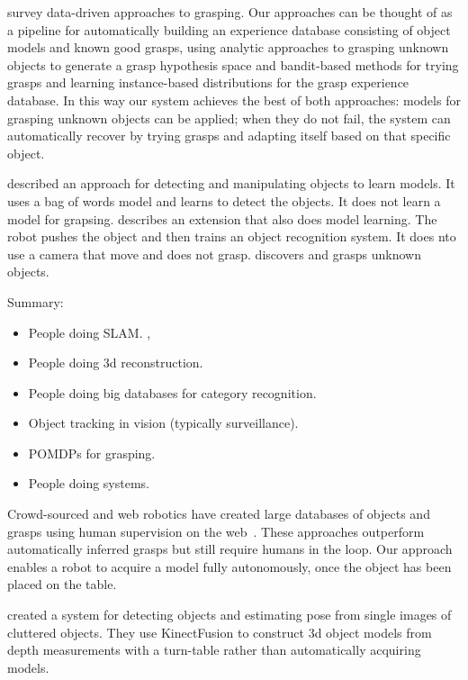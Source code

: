 \documentclass{article}
\begin{document}
\citet{bohg13} survey data-driven approaches to grasping.  Our
approaches can be thought of as a pipeline for automatically building
an experience database consisting of object models and known good
grasps, using analytic approaches to grasping unknown objects to
generate a grasp hypothesis space and bandit-based methods for trying
grasps and learning instance-based distributions for the grasp
experience database.  In this way our system achieves the best of both
approaches: models for grasping unknown objects can be applied; when
they do not fail, the system can automatically recover by trying
grasps and adapting itself based on that specific object. 

\citet{ude12} described an approach for detecting and manipulating
objects to learn models.  It uses a bag of words model and learns to
detect the objects.  It does not learn a model for grapsing.
\citet{schiebener13} describes an extension that also does model
learning.  The robot pushes the object and then trains an object
recognition system.  It does nto use a camera that move and does not
grasp.
\citet{schiebener12} discovers and grasps unknown objects.

Summary: 
\begin{itemize}
\item People doing SLAM.  \citet{wang07, gallagher09}, 
\item People doing 3d reconstruction.   \citet{krainin11, banta00}
\item People doing big databases for category recognition.  \citet{kent14a, kent14, lai11a, goldfeder09}
\item Object tracking in vision (typically surveillance).
\item POMDPs for grasping.  \citet{platt11, hsiao10}
\item People doing systems.  \citet{hudson12, ciocarlie14}
\end{itemize}




Crowd-sourced and web robotics have created large databases of objects
and grasps using human supervision on the web~\citep{kent14a, kent14}.
These approaches outperform automatically inferred grasps but still
require humans in the loop.  Our approach enables a robot to acquire a
model fully autonomously, once the object has been placed on the
table.

\citet{zhu14} created a system for detecting objects and estimating
pose from single images of cluttered objects.  They use KinectFusion
to construct 3d object models from depth measurements with a
turn-table rather than automatically acquiring models.
\end{document}
